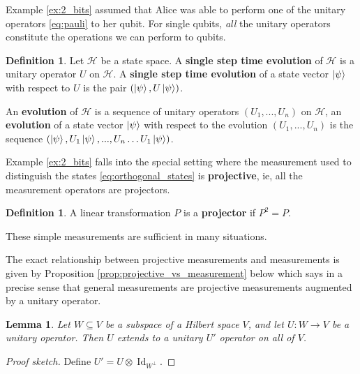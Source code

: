 \documentclass[12pt]{article}
\theoremstyle{plain}
\newtheorem{lemma}[thm]{Lemma}
\theoremstyle{definition}
\newtheorem{defn}[thm]{Definition} %
\newcommand{\call}[1]{\mathcal{#1}}
\newcommand{\lto}{\longrightarrow}
\begin{document}
	Example \ref{ex:2_bits} assumed that Alice was able to perform one of the unitary operators \eqref{eq:pauli} to her qubit. For single qubits, \emph{all} the unitary operators constitute the operations we can perform to qubits.
	
	\begin{defn}\label{def:time_evolution}
		Let $\call{H}$ be a state space. A \textbf{single step time evolution} of $\call{H}$ is a unitary operator $U$ on $\call{H}$. A \textbf{single step time evolution} of a state vector $\ket{\psi}$ with respect to $U$ is the pair $(\ket{\psi},U\ket{\psi})$.
		
		An \textbf{evolution} of $\call{H}$ is a sequence of unitary operators $(U_1,...,U_n)$ on $\call{H}$, an \textbf{evolution} of a state vector $\ket{\psi}$ with respect to the evolution $(U_1,...,U_n)$ is the sequence $(\ket{\psi},U_1\ket{\psi},...,U_n\hdots U_1\ket{\psi})$.
	\end{defn}
	
	Example \ref{ex:2_bits} falls into the special setting where the measurement used to distinguish the states \eqref{eq:orthogonal_states} is \textbf{projective}, ie, all the measurement operators are projectors.
	
	\begin{defn}
		A linear transformation $P$ is a \textbf{projector} if $P^2 = P$.
	\end{defn}
	
	These simple measurements are sufficient in many situations.
	
	The exact relationship between projective measurements and measurements is given by Proposition \ref{prop:projective_vs_measurement} below which says in a precise sense that general measurements are projective measurements augmented by a unitary operator.
	
		\begin{lemma}\label{lem:unitary_extension}
		Let $W \subseteq V$ be a subspace of a Hilbert space $V$, and let $U: W \lto V$ be a unitary operator. Then $U$ extends to a unitary $U'$ operator on all of $V$.
	\end{lemma}
	\begin{proof}[Proof sketch]
		Define $U' = U\otimes \operatorname{Id}_{W^{\perp}}$.
	\end{proof}
	
\end{document}
